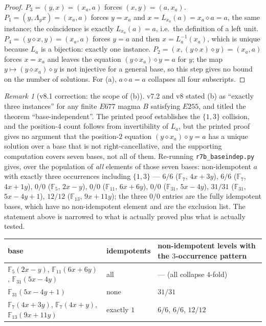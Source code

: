 \documentclass[11pt]{article}
\theoremstyle{plain}
\theoremstyle{definition}
\theoremstyle{remark}
\newtheorem*{remark*}{Remark}
\numberwithin{equation}{section}
\newcommand{\F}{\mathbb{F}}
\begin{document}
\begin{proof}
$P_3 = (y,x) = (x_a,a)$ forces $(x,y) = (a,x_a)$. $P_1 = (y,\Lambda_yx) = (x_a,a)$
forces $y = x_a$ and $x = L_{x_a}(a) = x_a\diamond a = a$, the same instance; the
coincidence is exactly $L_{x_a}(a) = a$, i.e.\ the definition of a left unit.
$P_4 = (y\diamond x,y) = (x_a,a)$ forces $y = a$ and then
$x = L_a^{-1}(x_a)$, which is unique because $L_a$ is a bijection: exactly one
instance. $P_2 = (x,(y\diamond x)\diamond y) = (x_a,a)$ forces $x = x_a$ and
leaves the equation $(y\diamond x_a)\diamond y = a$ for $y$; the map
$y\mapsto(y\diamond x_a)\diamond y$ is not injective for a general base, so this
step gives no bound on the number of solutions. For
(a), $a\diamond a = a$ collapses all four subscripts.
\end{proof}

\begin{remark*}[v8.1 correction: the scope of (b)]
v7.2 and v8 stated (b) as ``exactly three instances'' for any finite $E677$ magma
$B$ satisfying $E255$, and titled the theorem ``base-independent''. The printed
proof establishes the $\{1,3\}$ collision, and the position-$4$ count follows from
invertibility of $L_a$, but the printed proof gives no argument that the
position-$2$ equation $(y\diamond x_a)\diamond y = a$ has a unique solution over
a base that is not right-cancellative, and the supporting computation covers
seven bases, not all of them. Re-running
\texttt{r7b\_baseindep.py} gives, over the population of \emph{all} elements of
those seven bases: non-idempotent $a$ with exactly three occurrences including
$\{1,3\}$ --- $6/6$ ($\F_7$, $4x+3y$), $6/6$ ($\F_7$, $4x+1y$), $0/0$ ($\F_5$,
$2x-y$), $0/0$ ($\F_{11}$, $6x+6y$), $0/0$ ($\F_{31}$, $5x-4y$), $31/31$
($\F_{31}$, $5x-4y+1$), $12/12$ ($\F_{13}$, $9x+11y$); the three $0/0$ entries are
the fully idempotent bases, which have no non-idempotent element and are the
exclusion list. The statement above is narrowed to what is actually proved plus
what is actually tested.
\end{remark*}

\begin{center}
{\footnotesize
\begin{tabular}{lll}
\toprule
base & idempotents & non-idempotent levels with the $3$-occurrence pattern\\
\midrule
$\F_5(2x-y)$, $\F_{11}(6x+6y)$, $\F_{31}(5x-4y)$ & all & --- (all collapse $4$-fold)\\
$\F_{31}(5x-4y+1)$ & none & $31/31$\\
$\F_7(4x+3y)$, $\F_7(4x+y)$, $\F_{13}(9x+11y)$ & exactly $1$ & $6/6$, $6/6$, $12/12$\\
\bottomrule
\end{tabular}}
\end{center}
\end{document}

